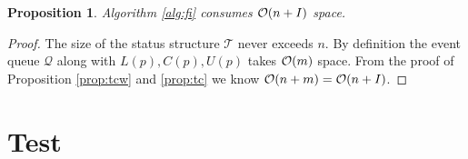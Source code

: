 \documentclass[a4paper]{article}
\newtheorem{prop}{Proposition}
\begin{document}
\begin{prop}
  Algorithm \ref{alg:fi} consumes $\mathcal{O}(n+I)$ space.
\end{prop}
\begin{proof}
  The size of the status structure $\mathcal{T}$ never exceeds $n$.
  By definition the event queue $\mathcal{Q}$ along with
  $L(p),C(p),U(p)$ takes $\mathcal{O}(m)$ space.
  From the proof of Proposition \ref{prop:tcw} and \ref{prop:tc}
  we know $\mathcal{O}(n+m) = \mathcal{O}(n+I)$.
\end{proof}

\section{Test}




\end{document}
